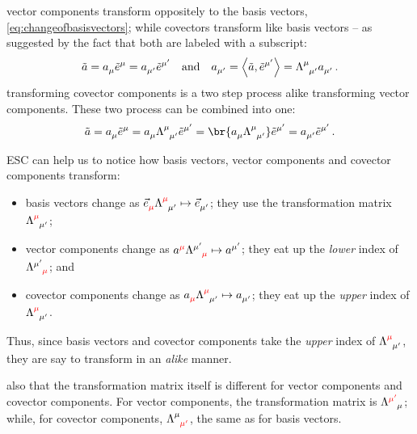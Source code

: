  vector components transform oppositely to the basis vectors, \cref{eq:changeofbasisvectors}; while covectors transform like basis vectors -- as suggested by the fact that both are labeled with a subscript:
%
\begin{equation}\label{eq:transformationofcovectorcomponents}
  \cov a = \tcov a\mu\tbcov\mu = \tcov a{\aidx\mu}\tbcov{\aidx\mu}\quad\text{and}\quad
  \tcov a{\aidx\mu} = \sprod{\cov a}{\tbcov{\aidx\mu}} = \ttransmat{\mu}{\aidx\mu}\tcov a{\aidx\mu}\,.
\end{equation}
%
 transforming covector components is a two step process alike transforming vector components. These two process can be combined into one:
%
\begin{equation*}
  \cov a = \tcov a\mu\tbcov\mu
         = \tcov a\mu\ttransmat{\mu}{\aidx\mu}\tbcov{\aidx\mu}
         = \br{\tcov a\mu\ttransmat\mu{\aidx\mu}}\tbcov{\aidx\mu}
         = \tcov a{\aidx\mu}\tbcov{\aidx\mu}\,.
\end{equation*}

 ESC can help us to notice how basis vectors, vector components and covector components transform:
%
\begin{itemize}
  \item basis vectors change as $\tbvec{\color{red}\mu}\ttransmat{\color{red}\mu}{\aidx\mu}\mapsto\tbvec{\aidx\mu}$; they use the transformation matrix $\ttransmat{\color{red}\mu}{\aidx\mu}$;
  \item vector components change as $\tvec a{\color{red}\mu}\ttransmat{\aidx\mu}{\color{red}\mu}\mapsto\tvec a{\aidx\mu}$; they eat up the \emph{lower} index of $\ttransmat{\aidx\mu}{\color{red}\mu}$; and
  \item covector components change as $\tcov a{\color{red}\mu}\ttransmat{\color{red}\mu}{\aidx\mu}\mapsto\tcov a{\aidx\mu}$; they eat up the \emph{upper} index of $\ttransmat{\color{red}\mu}{\aidx\mu}$.
\end{itemize}
%
Thus, since basis vectors and covector components take the \emph{upper} index of $\ttransmat{\color{red}\mu}{\aidx\mu}$, they are say to transform in an \emph{alike} manner.

 also that the transformation matrix itself is different for vector components and covector components. For vector components, the transformation matrix is $\ttransmat{\color{red}\aidx\mu}{\mu}$; while, for covector components, $\ttransmat{\mu}{\color{red}\aidx\mu}$, the same as for basis vectors.

